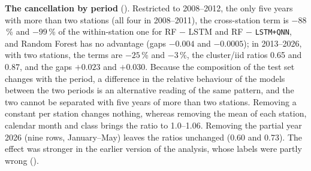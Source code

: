 \documentclass[11pt,a4paper]{article}
\begin{document}
\textbf{The cancellation by period} (). Restricted to 2008--2012, the only five years with more than two stations (all four in 2008--2011), the cross-station term is $-88$\,\% and $-99$\,\% of the within-station one for RF $-$ LSTM and RF $-$ \texttt{LSTM+QNN}, and Random Forest has no advantage (gaps $-0.004$ and $-0.0005$); in 2013--2026, with two stations, the terms are $-25$\,\% and $-3$\,\%, the cluster/iid ratios 0.65 and 0.87, and the gaps $+0.023$ and $+0.030$. Because the composition of the test set changes with the period, a difference in the relative behaviour of the models between the two periods is an alternative reading of the same pattern, and the two cannot be separated with five years of more than two stations. Removing a constant per station changes nothing, whereas removing the mean of each station, calendar month and class brings the ratio to 1.0--1.06. Removing the partial year 2026 (nine rows, January--May) leaves the ratios unchanged (0.60 and 0.73). The effect was stronger in the earlier version of the analysis, whose labels were partly wrong ().

\begin{table}[htbp]
\centering
\caption{Cluster-robust/DeLong ratio and its decomposition. Cross/within: cross-station term over within-station term. Corr.: mean correlation over station pairs of the yearly sums. Null: median [5\,\%, 95\,\%] of the ratio under the within-station permutation, and lower-tail $p$. Demeaned: ratio after removing station or station$\times$month means.}
\label{tab:cancellation}
{\small
{}}
\end{table}
\end{document}
